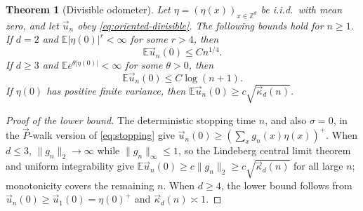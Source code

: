 \documentclass[11pt]{amsart}
\theoremstyle{plain}
\newtheorem{theorem}{Theorem}[section]
\theoremstyle{definition}
\newcommand{\Z}{\mathbb{Z}}
\newcommand{\E}{\mathbb{E}}
\begin{document}
\begin{theorem}[Divisible odometer]\label{thm:oriented}
	Let $\eta=(\eta(x))_{x\in\Z^d}$ be i.i.d.\ with mean zero, and let $\vec u_n$
	obey \eqref{eq:oriented-divisible}. The following bounds hold for $n\geq1$.
	If $d=2$ and $\E|\eta(0)|^r<\infty$ for some $r>4$, then
	\[
		\E \vec u_n(0)\leq Cn^{1/4}.
	\]
	If $d\geq3$ and $\E e^{\theta|\eta(0)|}<\infty$ for some $\theta>0$, then
	\[
		\E \vec u_n(0)\leq C\log(n+1).
	\]
	If $\eta(0)$ has positive finite variance, then
	$\E \vec u_n(0)\geq c\sqrt{\vec\kappa_d(n)}$.
\end{theorem}


\begin{proof}[Proof of the lower bound]
	The deterministic stopping time $n$, and also $\sigma=0$, in the
	$\vec P$-walk version of \eqref{eq:stopping} give
	$\vec u_n(0)\geq(\sum_xg_n(x)\eta(x))^+$. When $d\leq3$,
	$\|g_n\|_2\to\infty$ while $\|g_n\|_\infty\leq1$, so the Lindeberg central
	limit theorem and uniform integrability give
	$\E \vec u_n(0)\geq c\|g_n\|_2\geq c\sqrt{\vec\kappa_d(n)}$ for all large $n$;
	monotonicity covers the remaining $n$. When
	$d\geq4$, the lower bound follows from
	$\vec u_n(0)\geq\vec u_1(0)=\eta(0)^+$ and
	$\vec\kappa_d(n)\asymp1$.
\end{proof}
\end{document}
